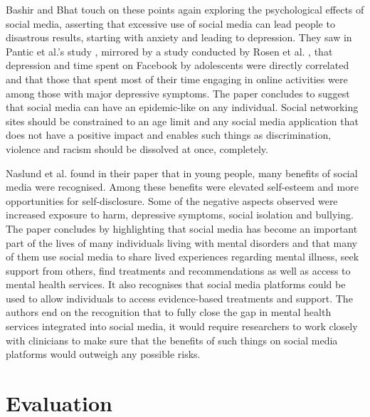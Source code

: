 \documentclass[lettersize,journal]{IEEEtran}
\begin{document}
    Bashir and Bhat \cite{Bashir et al 2017} touch on these points again exploring the psychological effects
    of social media, asserting that excessive use of social media can lead people to disastrous results, starting
    with anxiety and leading to depression. They saw in Pantic et al.'s study \cite{Pantic et al 2012}, mirrored
    by a study conducted by Rosen et al. \cite{Rosen et al 2013}, that depression and time spent on Facebook by
    adolescents were directly correlated and that those that spent most of their time engaging in online activities
    were among those with major depressive symptoms. The paper concludes to suggest that social media can have an
    epidemic-like on any individual. Social networking sites should be constrained to an age limit and any
    social media application that does not have a positive impact and enables such things as discrimination, violence
    and racism should be dissolved at once, completely.

    Naslund et al. \cite{Naslund et al 2020} found in their paper that in young people, many benefits of social
    media were recognised. Among these benefits were elevated self-esteem and more opportunities for
    self-disclosure. Some of the negative aspects observed were increased exposure to harm, depressive symptoms,
    social isolation and bullying. The paper concludes by highlighting that social media has become an important part
    of the lives of many individuals living with mental disorders and that many of them use social media to share
    lived experiences regarding mental illness, seek support from others, find treatments and recommendations as
    well as access to mental health services. It also recognises that social media platforms could be used to
    allow individuals to access evidence-based treatments and support. The authors end on the recognition that to
    fully close the gap in mental health services integrated into social media, it would require researchers
    to work closely with clinicians to make sure that the benefits of such things on social media platforms would
    outweigh any possible risks.






\section{Evaluation}
\end{document}
